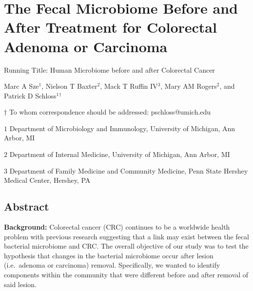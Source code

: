 \documentclass[12pt,]{article}
\title{}
\author{}
\date{}
\begin{document}
\section{The Fecal Microbiome Before and After Treatment for Colorectal
Adenoma or
Carcinoma}\label{the-fecal-microbiome-before-and-after-treatment-for-colorectal-adenoma-or-carcinoma}

\vspace{25mm}

\begin{center}
Running Title: Human Microbiome before and after Colorectal Cancer

\vspace{10mm}

Marc A Sze${^1}$, Nielson T Baxter${^2}$, Mack T Ruffin IV${^3}$, Mary AM Rogers${^2}$, and Patrick D Schloss${^1}$${^\dagger}$

\vspace{20mm}

$\dagger$ To whom correspondence should be addressed: pschloss@umich.edu

$1$ Department of Microbiology and Immunology, University of Michigan, Ann Arbor, MI

$2$ Department of Internal Medicine, University of Michigan, Ann Arbor, MI   

$3$ Department of Family Medicine and Community Medicine, Penn State Hershey Medical Center, Hershey, PA    


\end{center}

\newpage

\linenumbers

\subsection{Abstract}\label{abstract}

\textbf{Background:} Colorectal cancer (CRC) continues to be a worldwide
health problem with previous research suggesting that a link may exist
between the fecal bacterial microbiome and CRC. The overall objective of
our study was to test the hypothesis that changes in the bacterial
microbiome occur after lesion (i.e.~adenoma or carcinoma) removal.
Specifically, we wanted to identify components within the community that
were different before and after removal of said lesion.
\end{document}
